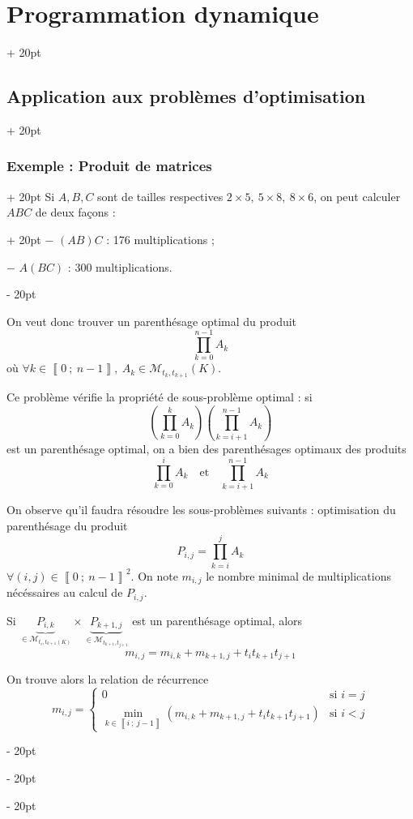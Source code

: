 \documentclass[a4paper, 12pt, twoside]{article}
\newcommand{\nset}[2]{\left\llbracket #1\ ;\ #2 \right\rrbracket}
\newcommand{\lr}[1]{\left( #1 \right)}
\newcommand{\ind}[1][20pt]{\advance\leftskip + #1}
\newcommand{\deind}[1][20pt]{\advance\leftskip - #1}
\newenvironment{indt}[2][20pt]{#2 \par \ind[#1]}{\par \deind} %
\begin{document}
\begin{indt}{\section{Programmation dynamique}}
\begin{indt}{\subsection{Application aux problèmes d'optimisation}}
\begin{indt}{\subsubsection{Exemple : Produit de matrices}}
                \begin{indt}{Si $A, B, C$ sont de tailles respectives $2 \times 5,\ 5 \times 8,\ 8 \times 6$, on peut calculer $ABC$ de deux façons :}
                    $-$ $(AB)C$ : 176 multiplications ;
                    
                    $-$ $A(BC)$ : 300 multiplications.
                \end{indt}
                
                On veut donc trouver un parenthésage optimal du produit
                    \[ \prod_{k = 0}^{n - 1} A_k \]
                où $\forall k \in \nset{0}{n - 1},\ A_k \in \mathcal M_{t_k, t_{k + 1}} (K)$.
                
                \vspace{12pt}
                
                Ce problème vérifie la propriété de sous-problème optimal : si
                    \[ \lr{ \prod_{k = 0}^k A_k } \lr{ \prod_{k = i + 1}^{n - 1} A_k } \]
                est un parenthésage optimal, on a bien des parenthésages optimaux des produits
                    \[ \prod_{k = 0}^i A_k \quad \text{et} \quad \prod_{k = i + 1}^{n - 1} A_k \]
                
                On observe qu'il faudra résoudre les sous-problèmes suivants : optimisation du parenthésage du produit
                    \[ P_{i, j} = \prod_{k = i}^j A_k \]
                $\forall (i, j) \in \nset 0 {n - 1}^2$. On note $m_{i, j}$ le nombre minimal de multiplications nécéssaires au calcul de $P_{i, j}$.
                
                Si $\underbrace{P_{i, k}}_{\in \mathcal M_{t_i, t_{k + 1} (K)}} \times \underbrace{P_{k + 1, j}}_{\in \mathcal M_{t_{k + 1}, t_{j + 1}}}$ est un parenthésage optimal, alors
                    \[ m_{i, j} = m_{i, k} + m_{k + 1, j} + t_i t_{k + 1} t_{j + 1} \]
                
                On trouve alors la relation de récurrence
                    \[
                        m_{i, j} =
                        \left\{
                        \begin{array}{ll}
                            0
                            & \text{si $i = j$}
                            \\
                            \min\limits_{k \in \nset{i}{j - 1}} \lr{ m_{i, k} + m_{k + 1, j} + t_i t_{k + 1} t_{j + 1} }
                            & \text{si $i < j$}
                        \end{array}
                        \right.
                    \]
                

\end{indt}
\end{indt}
\end{indt}
\end{document}
